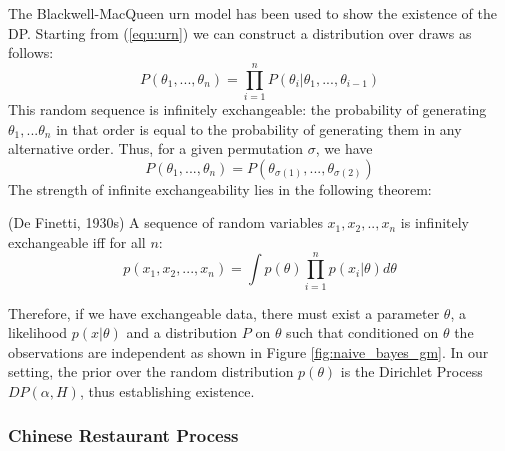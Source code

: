 The Blackwell-MacQueen urn model has been used to show the existence of the DP. Starting from (\ref{equ:urn}) we can construct a distribution over draws as follows:
\begin{equation}
    P(\theta_1,...,\theta_n) = \prod_{i=1}^{n}P(\theta_i|\theta_1,...,\theta_{i-1})
\end{equation}
This random sequence is infinitely exchangeable: the probability of generating $\theta_1,...\theta_n$ in that order is equal to the probability of generating them in any alternative order. Thus, for a given permutation $\sigma$, we have
\begin{equation}
    P(\theta_1,...,\theta_n) = P(\theta_{\sigma(1)},...,\theta_{\sigma(2)})
\end{equation}
The strength of infinite exchangeability lies in the following theorem:
\begin{theorem}
(De Finetti, 1930s) A sequence of random variables $x_1, x_2,..,x_n$ is infinitely exchangeable iff for all $n$:
\begin{equation}
    p(x_1,x_2,...,x_n) = \int p(\theta)\prod_{i=1}^{n}p(x_i|\theta)d\theta
\end{equation}
\end{theorem}
Therefore, if we have exchangeable data, there must exist a parameter $\theta$, a likelihood $p(x|\theta)$ and a distribution $P$ on $\theta$ such that conditioned on $\theta$ the observations are independent as shown in Figure \ref{fig:naive_bayes_gm}. In our setting, the prior over the random distribution $p(\theta)$ is the Dirichlet Process $DP(\alpha, H)$, thus establishing existence.

\subsubsection{Chinese Restaurant Process}

